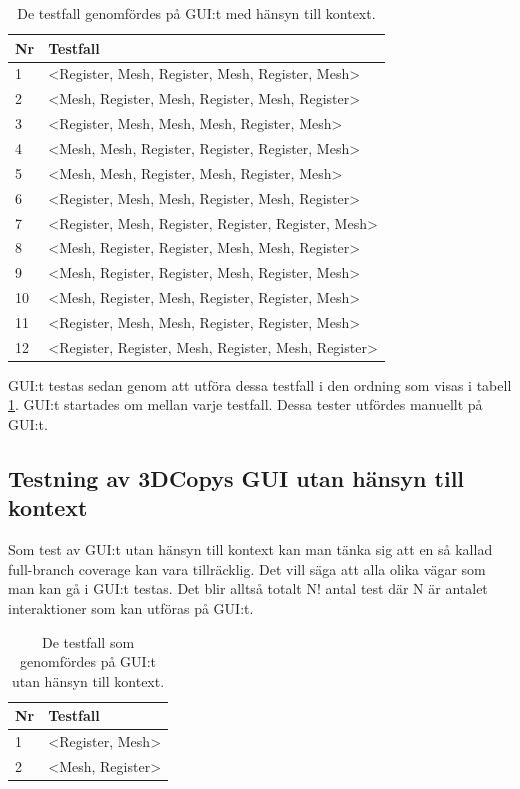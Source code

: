 \begin{table}[h]
	\caption{De testfall genomfördes på GUI:t med hänsyn till kontext.}
	\label{tbl:test_context}
	\centering
	\begin{tabular}{|l|l|}
		\hline
		\textbf{Nr} & \textbf{Testfall} \\
		\hline
		1 & <Register, Mesh, Register, Mesh, Register, Mesh> \\
		\hline
		2 & <Mesh, Register, Mesh, Register, Mesh, Register> \\
		\hline
		3 & <Register, Mesh, Mesh, Mesh, Register, Mesh> \\
		\hline
		4 & <Mesh, Mesh, Register, Register, Register, Mesh> \\
		\hline
		5 & <Mesh, Mesh, Register, Mesh, Register, Mesh> \\
		\hline
		6 & <Register, Mesh, Mesh, Register, Mesh, Register> \\
		\hline
		7 & <Register, Mesh, Register, Register, Register, Mesh> \\
		\hline
		8 & <Mesh, Register, Register, Mesh, Mesh, Register> \\
		\hline
		9 & <Mesh, Register, Register, Mesh, Register, Mesh> \\
		\hline
		10 & <Mesh, Register, Mesh, Register, Register, Mesh> \\
		\hline
		11 & <Register, Mesh, Mesh, Register, Register, Mesh> \\
		\hline
		12 & <Register, Register, Mesh, Register, Mesh, Register> \\
		\hline
	\end{tabular}
\end{table}

GUI:t testas sedan genom att utföra dessa testfall i den ordning som visas i tabell \ref{tbl:test_context}. GUI:t startades om mellan varje testfall. Dessa tester utfördes manuellt på GUI:t.

\subsection{Testning av 3DCopys GUI utan hänsyn till kontext}

Som test av GUI:t utan hänsyn till kontext kan man tänka sig att en så kallad full-branch coverage kan vara tillräcklig. Det vill säga att alla olika vägar som man kan gå i GUI:t testas. Det blir alltså totalt N! antal test där N är antalet interaktioner som kan utföras på GUI:t.

\begin{table}[h]
	\caption{De testfall som genomfördes på GUI:t utan hänsyn till kontext.}
	\label{tbl:test_nocontext}
	\centering
	\begin{tabular}{|l|l|}
		\hline
		\textbf{Nr} & \textbf{Testfall} \\
		\hline
		1 & <Register, Mesh> \\
		\hline
		2 & <Mesh, Register> \\
		\hline
	\end{tabular}
\end{table}

